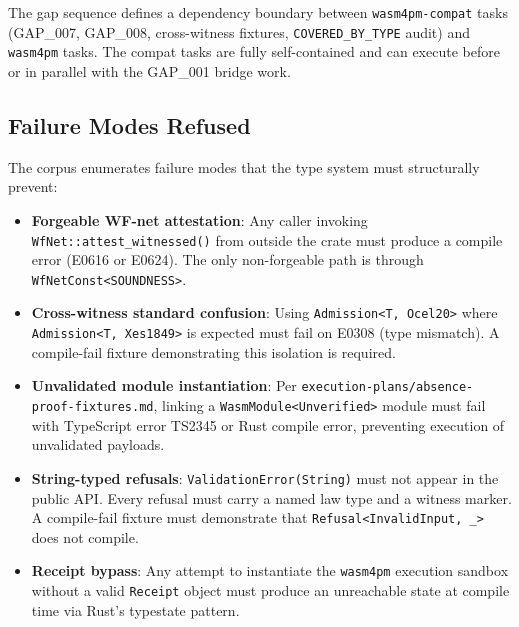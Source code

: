 The gap sequence defines a dependency boundary between \texttt{wasm4pm-compat} tasks
(GAP\_007, GAP\_008, cross-witness fixtures, \texttt{COVERED\_BY\_TYPE} audit) and
\texttt{wasm4pm} tasks. The compat tasks are fully self-contained and can execute
before or in parallel with the GAP\_001 bridge work.

\subsection{Failure Modes Refused}
\label{sec:prompts-architecture-failure}

The corpus enumerates failure modes that the type system must structurally prevent:

\begin{itemize}
  \item \textbf{Forgeable WF-net attestation}: Any caller invoking
    \texttt{WfNet::attest\_witnessed()} from outside the crate must produce a compile
    error (E0616 or E0624). The only non-forgeable path is through
    \texttt{WfNetConst<SOUNDNESS>}.
  \item \textbf{Cross-witness standard confusion}: Using
    \texttt{Admission<T, Ocel20>} where \texttt{Admission<T, Xes1849>} is expected
    must fail on E0308 (type mismatch). A compile-fail fixture demonstrating this
    isolation is required.
  \item \textbf{Unvalidated module instantiation}: Per
    \texttt{execution-plans/absence-proof-fixtures.md}, linking a
    \texttt{WasmModule<Unverified>} module must fail with TypeScript error TS2345
    or Rust compile error, preventing execution of unvalidated payloads.
  \item \textbf{String-typed refusals}: \texttt{ValidationError(String)} must not
    appear in the public API. Every refusal must carry a named law type and a witness
    marker. A compile-fail fixture must demonstrate that \texttt{Refusal<InvalidInput, \_>}
    does not compile.
  \item \textbf{Receipt bypass}: Any attempt to instantiate the \texttt{wasm4pm}
    execution sandbox without a valid \texttt{Receipt} object must produce an
    unreachable state at compile time via Rust's typestate pattern.
\end{itemize}
